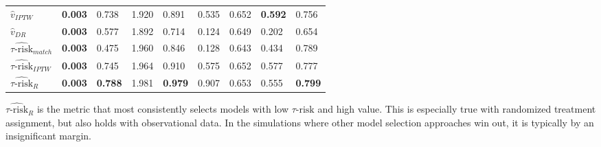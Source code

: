 \begin{table}[ht]
\begin{tabular}{lllllllll}
  $\hat v_{IPTW}$ & \bfseries{0.003} & 0.738 & 1.920 & 0.891 & 0.535 & 0.652 & \bfseries{0.592} & 0.756 \\ 
  $\hat v_{DR}$ & \bfseries{0.003} & 0.577 & 1.892 & 0.714 & 0.124 & 0.649 & 0.202 & 0.654 \\ 
  $\widehat{\tau\text{-risk}}_{match}$ & \bfseries{0.003} & 0.475 & 1.960 & 0.846 & 0.128 & 0.643 & 0.434 & 0.789 \\ 
  $\widehat{\tau\text{-risk}}_{IPTW}$ & \bfseries{0.003} & 0.745 & 1.964 & 0.910 & 0.575 & 0.652 & 0.577 & 0.777 \\ 
  $\widehat{\tau\text{-risk}}_{R}$ & \bfseries{0.003} & \bfseries{0.788} & 1.981 & \bfseries{0.979} & 0.907 & 0.653 & 0.555 & \bfseries{0.799} \\ 
   \hline
\end{tabular}
\end{table}

$\widehat{\tau\text{-risk}}_{R}$ is the metric that most consistently selects models with low $\tau\text{-risk}$ and high value. This is especially true with randomized treatment assignment, but also holds with observational data. In the simulations where other model selection approaches win out, it is typically by an insignificant margin.


